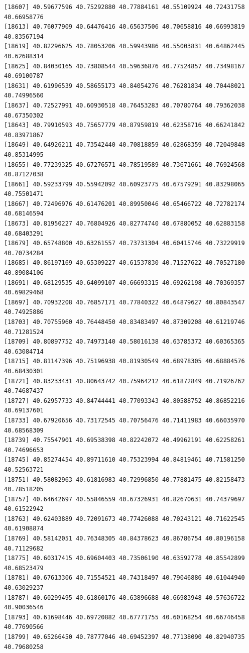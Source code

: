 \documentclass[
  letterpaper,
  DIV=11,
  numbers=noendperiod]{scrartcl}
\begin{document}
\begin{verbatim}
[18607] 40.59677596 40.75292880 40.77884161 40.55109924 40.72431758 40.66958776
[18613] 40.76077909 40.64476416 40.65637506 40.70658816 40.66993819 40.83567194
[18619] 40.82296625 40.78053206 40.59943986 40.55003831 40.64862445 40.62688314
[18625] 40.84030165 40.73808544 40.59636876 40.77524857 40.73498167 40.69100787
[18631] 40.61996539 40.58655173 40.84054276 40.76281834 40.70448021 40.74996560
[18637] 40.72527991 40.60930518 40.76453283 40.70780764 40.79362038 40.67350302
[18643] 40.79910593 40.75657779 40.87959819 40.62358716 40.66241842 40.83971867
[18649] 40.64926211 40.73542440 40.70818859 40.62868359 40.72049848 40.85314995
[18655] 40.77239325 40.67276571 40.78519589 40.73671661 40.76924568 40.87127038
[18661] 40.59233799 40.55942092 40.60923775 40.67579291 40.83298065 40.75501471
[18667] 40.72496976 40.61476201 40.89950046 40.65466722 40.72782174 40.68146594
[18673] 40.81950227 40.76804926 40.82774740 40.67880052 40.62883158 40.68403291
[18679] 40.65748800 40.63261557 40.73731304 40.60415746 40.73229919 40.70734284
[18685] 40.86197169 40.65309227 40.61537830 40.71527622 40.70527180 40.89084106
[18691] 40.68129535 40.64099107 40.66693315 40.69262198 40.70369357 40.69829468
[18697] 40.70932208 40.76857171 40.77840322 40.64879627 40.80843547 40.74925886
[18703] 40.70755960 40.76448450 40.83483497 40.87309208 40.61219746 40.71281524
[18709] 40.80897752 40.74973140 40.58016138 40.63785372 40.60365365 40.63084714
[18715] 40.81147396 40.75196938 40.81930549 40.68978305 40.68884576 40.68430301
[18721] 40.83233431 40.80643742 40.75964212 40.61872849 40.71926762 40.74687437
[18727] 40.62957733 40.84744441 40.77093343 40.80588752 40.86852216 40.69137601
[18733] 40.67920656 40.73172545 40.70756476 40.71411983 40.66035970 40.68568309
[18739] 40.75547901 40.69538398 40.82242072 40.49962191 40.62258261 40.74696653
[18745] 40.85274454 40.89711610 40.75323994 40.84819461 40.71581250 40.52563721
[18751] 40.58082963 40.61816983 40.72996850 40.77881475 40.82158473 40.78518205
[18757] 40.64642697 40.55846559 40.67326931 40.82670631 40.74379697 40.61522942
[18763] 40.62403889 40.72091673 40.77426088 40.70243121 40.71622545 40.61908874
[18769] 40.58142051 40.76348305 40.84378623 40.86786754 40.80196158 40.71129682
[18775] 40.60317415 40.69604403 40.73506190 40.63592778 40.85542899 40.68523479
[18781] 40.67613306 40.71554521 40.74318497 40.79046886 40.61044940 40.63029237
[18787] 40.60299495 40.61860176 40.63896688 40.66983948 40.57636722 40.90036546
[18793] 40.61698446 40.69720882 40.67771755 40.60168254 40.66746458 40.77690566
[18799] 40.65266450 40.78777046 40.69452397 40.77138090 40.82940735 40.79680258

\end{verbatim}
\end{document}
